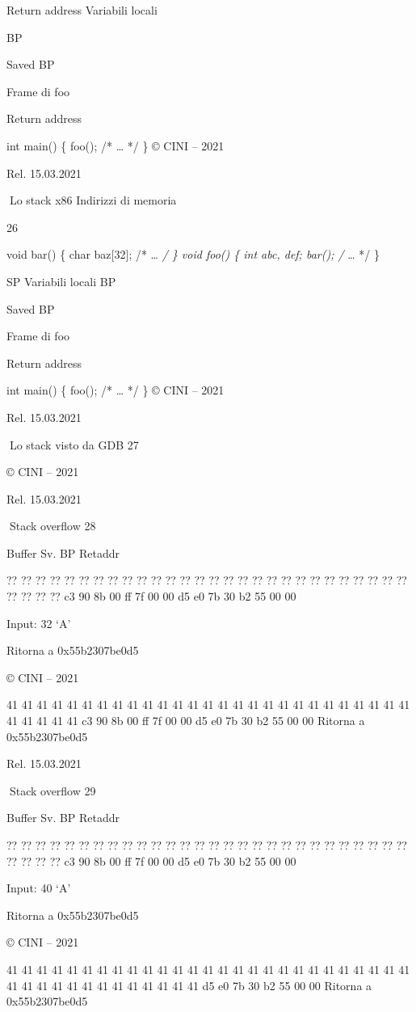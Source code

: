 \documentclass[11pt,a4paper]{article}
\begin{document}
Return address Variabili locali

BP

Saved BP

Frame di foo

Return address

int main() \{ foo(); /* \ldots{} */ \} © CINI -- 2021

Rel. 15.03.2021

Lo stack x86 Indirizzi di memoria

26

void bar() \{ char baz{[}32{]}; /* \ldots{} \emph{/ \} void foo() \{ int
abc, def; bar(); /} \ldots{} */ \}

SP Variabili locali BP

Saved BP

Frame di foo

Return address

int main() \{ foo(); /* \ldots{} */ \} © CINI -- 2021

Rel. 15.03.2021

Lo stack visto da GDB 27

© CINI -- 2021

Rel. 15.03.2021

Stack overflow 28

Buffer Sv. BP Retaddr

?? ?? ?? ?? ?? ?? ?? ?? ?? ?? ?? ?? ?? ?? ?? ?? ?? ?? ?? ?? ?? ?? ?? ??
?? ?? ?? ?? ?? ?? ?? ?? c3 90 8b 00 ff 7f 00 00 d5 e0 7b 30 b2 55 00 00

Input: 32 `A'

Ritorna a 0x55b2307be0d5

© CINI -- 2021

41 41 41 41 41 41 41 41 41 41 41 41 41 41 41 41 41 41 41 41 41 41 41 41
41 41 41 41 41 41 41 41 c3 90 8b 00 ff 7f 00 00 d5 e0 7b 30 b2 55 00 00
Ritorna a 0x55b2307be0d5

Rel. 15.03.2021

Stack overflow 29

Buffer Sv. BP Retaddr

?? ?? ?? ?? ?? ?? ?? ?? ?? ?? ?? ?? ?? ?? ?? ?? ?? ?? ?? ?? ?? ?? ?? ??
?? ?? ?? ?? ?? ?? ?? ?? c3 90 8b 00 ff 7f 00 00 d5 e0 7b 30 b2 55 00 00

Input: 40 `A'

Ritorna a 0x55b2307be0d5

© CINI -- 2021

41 41 41 41 41 41 41 41 41 41 41 41 41 41 41 41 41 41 41 41 41 41 41 41
41 41 41 41 41 41 41 41 41 41 41 41 41 41 41 41 d5 e0 7b 30 b2 55 00 00
Ritorna a 0x55b2307be0d5
\end{document}
